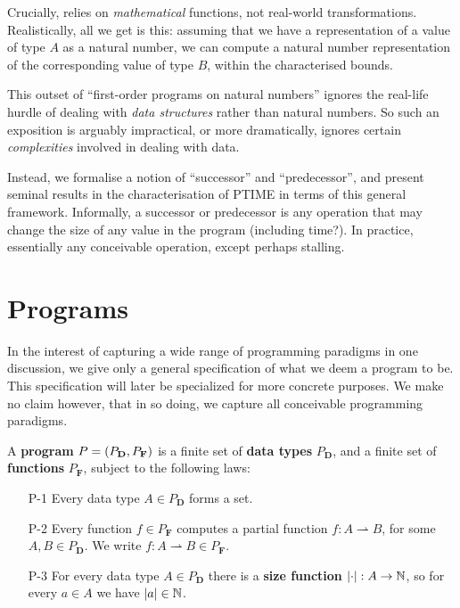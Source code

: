 Crucially,  relies on \emph{mathematical} functions, not
real-world transformations. Realistically, all we get is this: assuming that we
have a representation of a value of type $A$ as a natural number, we can
compute a natural number representation of the corresponding value of type $B$,
within the characterised bounds.

This outset of ``first-order programs on natural numbers'' ignores the
real-life hurdle of dealing with \emph{data structures} rather than natural
numbers. So such an exposition is arguably impractical, or more dramatically,
ignores certain \emph{complexities} involved in dealing with data.

Instead, we formalise a notion of ``successor'' and ``predecessor'', and
present seminal results in the characterisation of PTIME in terms of this
general framework. Informally, a successor or predecessor is any operation that
may change the size of any value in the program (including time?). In practice,
essentially any conceivable operation, except perhaps stalling.

\section{Programs}


In the interest of capturing a wide range of programming paradigms in one
discussion, we give only a general specification of what we deem a program to
be. This specification will later be specialized for more concrete purposes. We
make no claim however, that in so doing, we capture all conceivable programming
paradigms.

\begin{specification}

A \textbf{program} $P = {\mathopen{}\left({P_\mathbf{D}, P_\mathbf{F}}\right)\mathclose{}}$ is a finite set of
\textbf{data types} $P_\mathbf{D}$, and a finite set of \textbf{functions}
$P_\mathbf{F}$, subject to the following laws:

\begin{enumerate}

\item [P-1] Every data type $A \in P_\mathbf{D}$ forms a set.

\item [P-2] Every function $f \in P_\mathbf{F}$ computes a partial function $f
: A \rightharpoonup B$, for some $A, B\in P_\mathbf{D}$. We write $f : A
\rightharpoonup B \in P_\mathbf{F}$.

\item [P-3] For every data type $A \in P_\mathbf{D}$ there is a \textbf{size
function} ${\mathopen{}\left|{\cdot}\right|\mathclose{}} : A \rightarrow \mathbb{N}$, so for every $a \in A$ we
have ${\mathopen{}\left|{a}\right|\mathclose{}} \in \mathbb{N}$.

\end{enumerate}

\end{specification}

